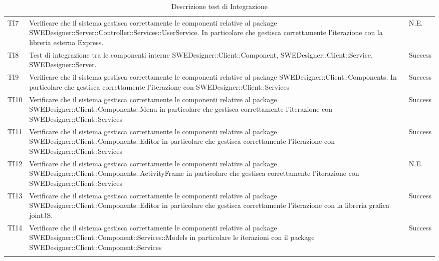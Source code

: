 \begin{longtable}{p{2cm}!{\VRule[1pt]}p{9.5cm}!{\VRule[1pt]}p{1.5cm}}
TI7 & Verificare che il sistema gestisca correttamente le componenti relative al package SWEDesigner::Server::Controller::Services::UserService. In particolare che gestisca correttamente l'iterazione con la libreria esterna Express. & N.E.\\

TI8 & Test di integrazione tra le componenti interne SWEDesigner::Client::Component, SWEDesigner::Client::Service, SWEDesigner::Server. & Success\\

TI9 & Verificare che il sistema gestisca correttamente le componenti relative al package SWEDesigner::Client::Components. In particolare che gestisca correttamente l’iterazione con SWEDesigner::Client::Services & Success\\

TI10 & Verificare che il sistema gestisca correttamente le componenti relative al package SWEDesigner::Client::Components::Menu in particolare che gestisca correttamente l'iterazione con SWEDesigner::Client::Services & Success\\

TI11 & Verificare che il sistema gestisca correttamente le componenti relative al package SWEDesigner::Client::Components::Editor in particolare che gestisca correttamente l'iterazione con SWEDesigner::Client::Services & Success\\

TI12 & Verificare che il sistema gestisca correttamente le componenti relative al package SWEDesigner::Client::Components::ActivityFrame in particolare che gestisca correttamente l'iterazione con SWEDesigner::Client::Services & N.E.\\

TI13 & Verificare che il sistema gestisca correttamente le componenti relative al package SWEDesigner::Client::Components::Editor in particolare che gestisca correttamente l'iterazione con la libreria grafica jointJS. & Success\\

TI14 & Verificare che il sistema gestisca correttamente le componenti relative al package SWEDesigner::Client::Component::Services::Models in particolare le iterazioni con il  package SWEDesigner::Client::Component::Services & Success\\

\caption{Descrizione test di Integrazione}
\end{longtable}

